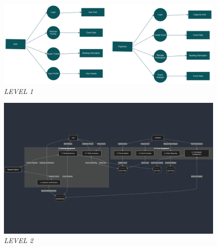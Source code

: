\documentclass[twoside,a4paper,openright]{report} %
\begin{document}
\begin{figure}[H]
	\centering
	\includegraphics[scale=0.50]{dfd2.jpg}
	\caption{\textit{LEVEL 1 }}
\end{figure} 

\begin{figure}[H]
	\centering
	\includegraphics[width=\textwidth]{dfd3.jpg}
	\caption{\textit{LEVEL 2}}
\end{figure}  
\end{document}
